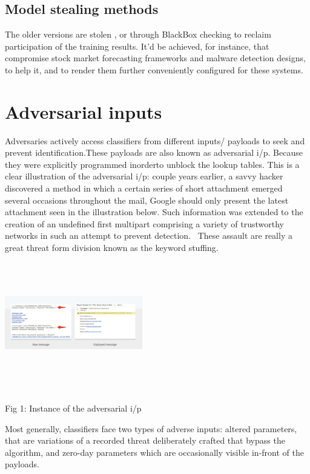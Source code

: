 \documentclass[journal,twoside,web]{ieeecolor}
\begin{document}
\subsection{Model stealing methods}
The older versions are stolen , or through BlackBox checking to reclaim participation of the training results. It'd be achieved, for instance, that compromise stock market forecasting frameworks and malware detection designs, to help it, and to render them further conveniently configured for these systems.



\section{Adversarial inputs}
Adversaries actively access classifiers from different inputs/ payloads to seek and prevent identification.These payloads are also known as  adversarial i/p. Because they were explicitly programmed inorderto unblock the lookup tables.
This is a clear illustration of the adversarial i/p: couple years earlier, a savvy hacker discovered a method in which a certain series of short attachment emerged several occasions throughout the mail, Google should only present the latest attachment seen in the illustration below. Such information was extended to the creation of an undefined first multipart comprising a variety of trustworthy networks in such an attempt to prevent detection.  These assault are really a great threat form division known as the keyword stuffing. \\

\newline
\includegraphics[width=0.45\textwidth,height=6cm]{pictures/1.png}
\begin{center}
Fig 1: Instance of the adversarial i/p
\end{center}

Most generally, classifiers face two types of adverse inputs: altered parameters, that are variations of a recorded threat deliberately crafted that bypass the algorithm, and zero-day parameters which are occasionally visible in-front of the payloads. 
\end{document}
